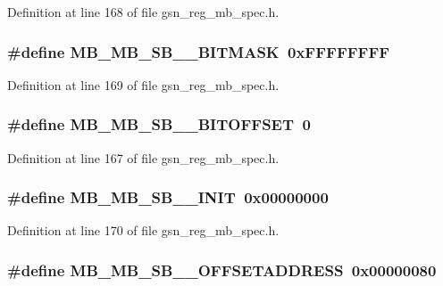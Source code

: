 Definition at line 168 of file gsn\_\-reg\_\-mb\_\-spec.h.

\hypertarget{a00562_a484ae28fbbfc9a5ae0222c6828eeccb3}{
\subsubsection[{MB\_\-MB\_\-SB\_\-0\_\-BITMASK}]{\setlength{\rightskip}{0pt plus 5cm}\#define MB\_\-MB\_\-SB\_\_\-BITMASK~0xFFFFFFFF}}
\label{a00562_a484ae28fbbfc9a5ae0222c6828eeccb3}


Definition at line 169 of file gsn\_\-reg\_\-mb\_\-spec.h.

\hypertarget{a00562_a29bc6720abd22fcd87f1458852af7a7b}{
\subsubsection[{MB\_\-MB\_\-SB\_\-0\_\-BITOFFSET}]{\setlength{\rightskip}{0pt plus 5cm}\#define MB\_\-MB\_\-SB\_\_\-BITOFFSET~0}}
\label{a00562_a29bc6720abd22fcd87f1458852af7a7b}


Definition at line 167 of file gsn\_\-reg\_\-mb\_\-spec.h.

\hypertarget{a00562_adf23d1d0f145253a7e26cbd3b396ec59}{
\subsubsection[{MB\_\-MB\_\-SB\_\-0\_\-INIT}]{\setlength{\rightskip}{0pt plus 5cm}\#define MB\_\-MB\_\-SB\_\_\-INIT~0x00000000}}
\label{a00562_adf23d1d0f145253a7e26cbd3b396ec59}


Definition at line 170 of file gsn\_\-reg\_\-mb\_\-spec.h.

\hypertarget{a00562_aa21b93b1cc20d455d00e7358f5651b2f}{
\subsubsection[{MB\_\-MB\_\-SB\_\-0\_\-OFFSETADDRESS}]{\setlength{\rightskip}{0pt plus 5cm}\#define MB\_\-MB\_\-SB\_\_\-OFFSETADDRESS~0x00000080}}
\label{a00562_aa21b93b1cc20d455d00e7358f5651b2f}


